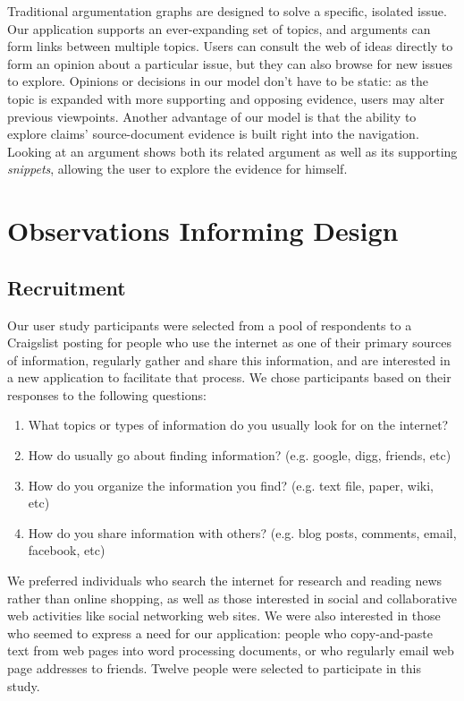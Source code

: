 \documentclass{chi2009}
\begin{document}
Traditional argumentation graphs are designed to solve a specific, isolated issue. Our application supports an ever-expanding set of topics, and arguments can form links between multiple topics. Users can consult the web of ideas directly to form an opinion about a particular issue, but they can also browse for new issues to explore. Opinions or decisions in our model don't have to be static: as the topic is expanded with more supporting and opposing evidence, users may alter previous viewpoints. Another advantage of our model is that the ability to explore claims' source-document evidence is built right into the navigation. Looking at an argument shows both its related argument as well as its supporting {\it snippets}, allowing the user to explore the evidence for himself. 



\section{Observations Informing Design}


\subsection{Recruitment}
Our user study participants were selected from a pool of respondents to a Craigslist posting for people who use the internet as one of their primary sources of information, regularly gather and share this information, and are interested in a new application to facilitate that process. We chose participants based on their responses to the following questions:
\begin{enumerate}
	\item What topics or types of information do you usually look for on the internet?
	\item How do usually go about finding information? (e.g. google, digg, friends, etc)
	\item How do you organize the information you find? (e.g. text file, paper, wiki, etc)
	\item How do you share information with others? (e.g. blog posts, comments, email, facebook, etc)
\end{enumerate}
We preferred individuals who search the internet for research and reading news rather than online shopping, as well as those interested in social and collaborative web activities like social networking web sites.  We were also interested in those who seemed to express a need for our application: people who copy-and-paste text from web pages into word processing documents, or who regularly email web page addresses to friends. Twelve people were selected to participate in this study.
\end{document}
